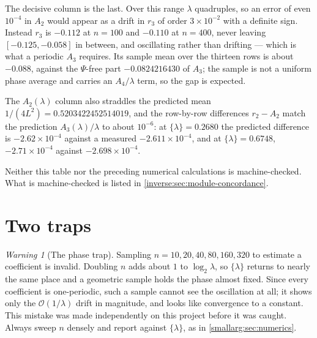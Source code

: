 \documentclass[11pt,oneside]{article}
\theoremstyle{definition}
\theoremstyle{remark}
\newtheorem{warning}[warning]{Warning}
\newcommand{\bigO}{\mathcal O}
\begin{document}
The decisive column is the last.  Over this range $\lambda$ quadruples, so
an error of even $10^{-4}$ in $A_2$ would appear as a drift in $r_3$ of
order $3\times10^{-2}$ with a definite sign.  Instead $r_3$ is $-0.112$ at
$n=100$ and $-0.110$ at $n=400$, never leaving $[-0.125,-0.058]$ in
between, and oscillating rather than drifting --- which is what a periodic
$A_3$ requires.  Its sample mean over the thirteen rows is about $-0.088$,
against the $\Psi$-free part $-0.0824216430$ of $A_3$; the sample is not a
uniform phase average and carries an $A_4/\lambda$ term, so the gap is
expected.

The $A_2(\lambda)$ column also straddles the predicted mean
$1/(4L^2)=0.5203422452514019$, and the row-by-row differences
$r_2-A_2$ match the prediction $A_3(\lambda)/\lambda$ to about $10^{-6}$:
at $\{\lambda\}=0.2680$ the predicted difference is $-2.62\times10^{-4}$
against a measured $-2.611\times10^{-4}$, and at $\{\lambda\}=0.6748$,
$-2.71\times10^{-4}$ against $-2.698\times10^{-4}$.

Neither this table nor the preceding numerical calculations is machine-checked.  What is
machine-checked is listed in \cref{inverse:sec:module-concordance}.

\section{Two traps}\label{smallarg:sec:traps}

\begin{warning}[The phase trap]
Sampling $n=10,20,40,80,160,320$ to estimate a coefficient is invalid.  Doubling
$n$ adds about $1$ to $\log_2\lambda$, so $\{\lambda\}$ returns to nearly the
same place and a geometric sample holds the phase almost fixed.  Since every
coefficient is one-periodic, such a sample cannot see the oscillation at all;
it shows only the $\bigO(1/\lambda)$ drift in magnitude, and looks like
convergence to a constant.  This mistake was made independently on this project
before it was caught.  Always sweep $n$ densely and report against
$\{\lambda\}$, as in \cref{smallarg:sec:numerics}.
\end{warning}
\end{document}
